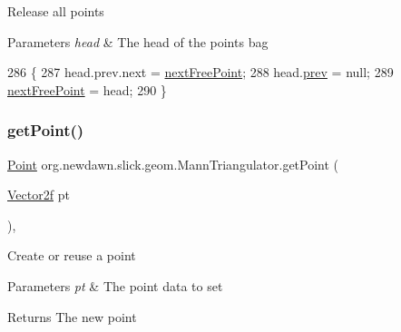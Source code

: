 Release all points


\begin{DoxyParams}{Parameters}
{\em head} & The head of the points bag \\
\hline
\end{DoxyParams}

\begin{DoxyCode}
286                                         \{
287         head.prev.next = \mbox{\hyperlink{classorg_1_1newdawn_1_1slick_1_1geom_1_1_mann_triangulator_a118a96eab8295cfebe18ec95b0236640}{nextFreePoint}};
288         head.\mbox{\hyperlink{classorg_1_1newdawn_1_1slick_1_1geom_1_1_mann_triangulator_1_1_point_aada0547222c51b32a918839db2eca9f2}{prev}} = null;
289         \mbox{\hyperlink{classorg_1_1newdawn_1_1slick_1_1geom_1_1_mann_triangulator_a118a96eab8295cfebe18ec95b0236640}{nextFreePoint}} = head;
290     \}
\end{DoxyCode}
\mbox{\label{classorg_1_1newdawn_1_1slick_1_1geom_1_1_mann_triangulator_aaeb702ea8e30747148abb637eb7cc342}} 
\subsubsection{\texorpdfstring{get\+Point()}{getPoint()}}
{\footnotesize\ttfamily \mbox{\hyperlink{classorg_1_1newdawn_1_1slick_1_1geom_1_1_mann_triangulator_1_1_point}{Point}} org.\+newdawn.\+slick.\+geom.\+Mann\+Triangulator.\+get\+Point (\begin{DoxyParamCaption}\item[{\mbox{\hyperlink{classorg_1_1newdawn_1_1slick_1_1geom_1_1_vector2f}{Vector2f}}}]{pt }\end{DoxyParamCaption})\hspace{0.3cm}{\ttfamily [inline]}, {\ttfamily [private]}}

Create or reuse a point


\begin{DoxyParams}{Parameters}
{\em pt} & The point data to set \\
\hline
\end{DoxyParams}
\begin{DoxyReturn}{Returns}
The new point 
\end{DoxyReturn}

